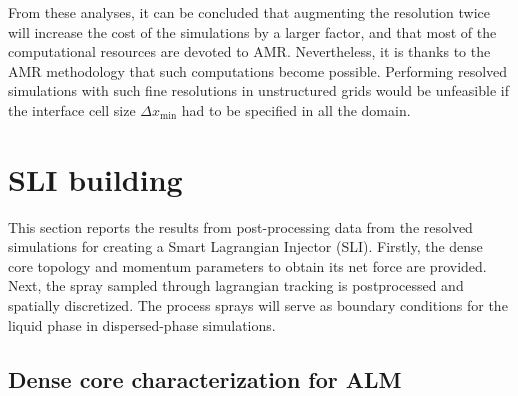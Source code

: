 From these analyses, it can be concluded that  augmenting the resolution twice will increase the cost of the simulations by a larger factor, and that most of the computational resources are devoted to AMR. Nevertheless, it is thanks to the AMR methodology that such computations become possible. Performing resolved simulations with such fine resolutions in unstructured grids would be unfeasible if the interface cell size $\Delta x_\mathrm{min}$ had to be specified in all the domain.



\clearpage

\section{SLI building}
\label{sec:ch5_SLI_building}

This section reports the results from post-processing data from the resolved simulations for creating a Smart Lagrangian Injector (SLI). Firstly, the dense core topology and momentum parameters to obtain its net force are provided. Next, the spray sampled through lagrangian tracking is postprocessed and spatially discretized. The process sprays will serve as boundary conditions for the liquid phase in dispersed-phase simulations.



\subsection{Dense core characterization for ALM}
\label{subsec:ch5_DC_topology_characterization}




